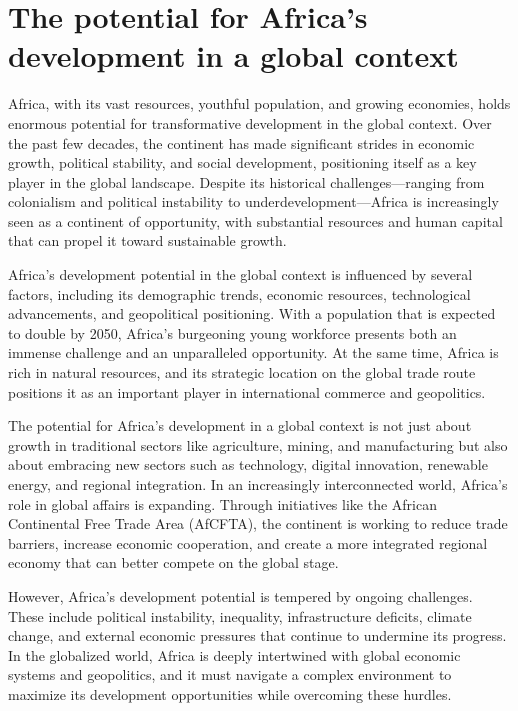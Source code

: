 \documentclass[10pt]{article}
\begin{document}
\section*{The potential for Africa's development in a global context}

Africa, with its vast resources, youthful population, and growing economies, holds enormous
potential for transformative development in the global context. Over the past few decades, the
continent has made significant strides in economic growth, political stability, and social
development, positioning itself as a key player in the global landscape. Despite its historical
challenges---ranging from colonialism and political instability to underdevelopment---Africa is
increasingly seen as a continent of opportunity, with substantial resources and human capital
that can propel it toward sustainable growth.

Africa's development potential in the global context is influenced by several factors, including its
demographic trends, economic resources, technological advancements, and geopolitical
positioning. With a population that is expected to double by 2050, Africa's burgeoning young
workforce presents both an immense challenge and an unparalleled opportunity. At the same
time, Africa is rich in natural resources, and its strategic location on the global trade route
positions it as an important player in international commerce and geopolitics.

The potential for Africa's development in a global context is not just about growth in traditional
sectors like agriculture, mining, and manufacturing but also about embracing new sectors such
as technology, digital innovation, renewable energy, and regional integration. In an increasingly
interconnected world, Africa's role in global affairs is expanding. Through initiatives like the
African Continental Free Trade Area (AfCFTA), the continent is working to reduce trade barriers,
increase economic cooperation, and create a more integrated regional economy that can better
compete on the global stage.

However, Africa's development potential is tempered by ongoing challenges. These include
political instability, inequality, infrastructure deficits, climate change, and external economic
pressures that continue to undermine its progress. In the globalized world, Africa is deeply
intertwined with global economic systems and geopolitics, and it must navigate a complex
environment to maximize its development opportunities while overcoming these hurdles.
\end{document}
